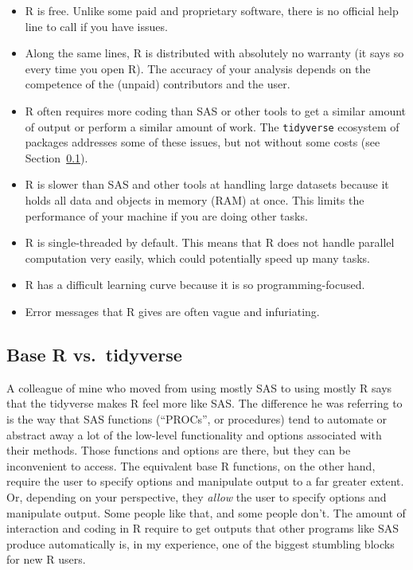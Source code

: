 \documentclass[
  13,
  letterpaper,
]{report}
\begin{document}
\begin{itemize}
\item
  R is free. Unlike some paid and proprietary software, there is no
  official help line to call if you have issues.
\item
  Along the same lines, R is distributed with absolutely no warranty (it
  says so every time you open R). The accuracy of your analysis depends
  on the competence of the (unpaid) contributors and the user.
\item
  R often requires more coding than SAS or other tools to get a similar
  amount of output or perform a similar amount of work. The
  \texttt{tidyverse} ecosystem of packages addresses some of these
  issues, but not without some costs (see
  Section~\ref{sec-02-faq-tidy}).
\item
  R is slower than SAS and other tools at handling large datasets
  because it holds all data and objects in memory (RAM) at once. This
  limits the performance of your machine if you are doing other tasks.
\item
  R is single-threaded by default. This means that R does not handle
  parallel computation very easily, which could potentially speed up
  many tasks.
\item
  R has a difficult learning curve because it is so programming-focused.
\item
  Error messages that R gives are often vague and infuriating.
\end{itemize}

\subsection{Base R vs.~tidyverse}\label{sec-02-faq-tidy}

A colleague of mine who moved from using mostly SAS to using mostly R
says that the tidyverse makes R feel more like SAS. The difference he
was referring to is the way that SAS functions (``PROCs'', or
procedures) tend to automate or abstract away a lot of the low-level
functionality and options associated with their methods. Those functions
and options are there, but they can be inconvenient to access. The
equivalent base R functions, on the other hand, require the user to
specify options and manipulate output to a far greater extent. Or,
depending on your perspective, they \emph{allow} the user to specify
options and manipulate output. Some people like that, and some people
don't. The amount of interaction and coding in R require to get outputs
that other programs like SAS produce automatically is, in my experience,
one of the biggest stumbling blocks for new R users.
\end{document}
